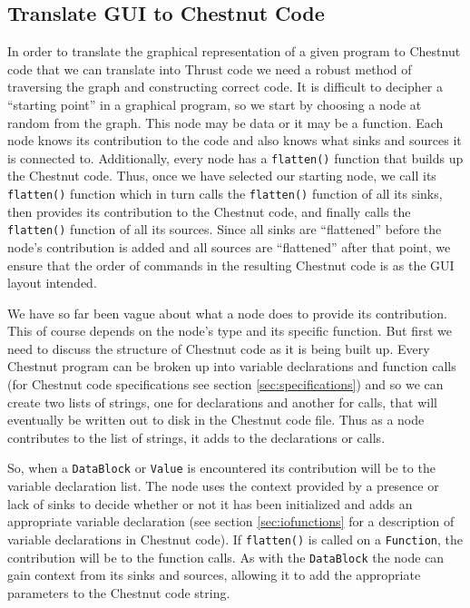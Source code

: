 \documentclass[twocolumn]{article}
\renewcommand{\|}{\origbar} %
\newcommand{\code}[1]{\texttt{#1}}
\begin{document}
\subsection{Translate GUI to Chestnut Code} 


In order to translate the graphical representation of a given program to Chestnut code that we can translate into Thrust code we need a robust method of traversing the graph and constructing correct code. It is difficult to decipher a ``starting point'' in a graphical program, so we start by choosing a node at random from the graph. This node may be data or it may be a function. Each node knows its contribution to the code and also knows what sinks and sources it is connected to. Additionally, every node has a \code{flatten()} function that builds up the Chestnut code. Thus, once we have selected our starting node, we call its \code{flatten()} function which in turn calls the \code{flatten()} function of all its sinks, then provides its contribution to the Chestnut code, and finally calls the \code{flatten()} function of all its sources. Since all sinks are ``flattened'' before the node's contribution is added and all sources are ``flattened'' after that point, we ensure that the order of commands in the resulting Chestnut code is as the GUI layout intended.

We have so far been vague about what a node does to provide its contribution. This of course depends on the node's type and its specific function. But first we need to discuss the structure of Chestnut code as it is being built up. Every Chestnut program can be broken up into variable declarations and function calls (for Chestnut code specifications see section \ref{sec:specifications}) and so we can create two lists of strings, one for declarations and another for calls, that will eventually be written out to disk in the Chestnut code file. Thus as a node contributes to the list of strings, it adds to the declarations or calls. 

So, when a \code{DataBlock} or \code{Value} is encountered its contribution will be to the variable declaration list. The node uses the context provided by a presence or lack of sinks to decide whether or not it has been initialized and adds an appropriate variable declaration (see section \ref{sec:iofunctions} for a description of variable declarations in Chestnut code). If \code{flatten()} is called on a \code{Function}, the contribution will be to the function calls. As with the \code{DataBlock} the node can gain context from its sinks and sources, allowing it to add the appropriate parameters to the Chestnut code string.
\end{document}
